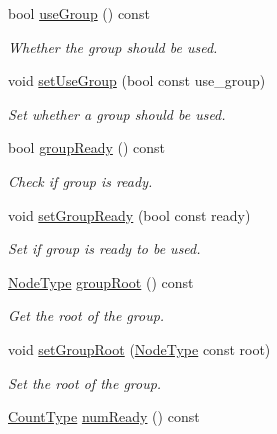 \begin{DoxyCompactItemize}
bool \hyperlink{structvt_1_1vrt_1_1collection_1_1_holder_af9a9e5dbf89d84e9fb4d267f720bfa4e}{use\+Group} () const
\begin{DoxyCompactList}\small\item\em Whether the group should be used. \end{DoxyCompactList}\item 
void \hyperlink{structvt_1_1vrt_1_1collection_1_1_holder_aa76e02e027429572c1c9b2169d013e56}{set\+Use\+Group} (bool const use\+\_\+group)
\begin{DoxyCompactList}\small\item\em Set whether a group should be used. \end{DoxyCompactList}\item 
bool \hyperlink{structvt_1_1vrt_1_1collection_1_1_holder_afeafe4c77613531a166be80bdaea4fd6}{group\+Ready} () const
\begin{DoxyCompactList}\small\item\em Check if group is ready. \end{DoxyCompactList}\item 
void \hyperlink{structvt_1_1vrt_1_1collection_1_1_holder_aa666f9e2960605203d325fd39de82dd7}{set\+Group\+Ready} (bool const ready)
\begin{DoxyCompactList}\small\item\em Set if group is ready to be used. \end{DoxyCompactList}\item 
\hyperlink{namespacevt_a866da9d0efc19c0a1ce79e9e492f47e2}{Node\+Type} \hyperlink{structvt_1_1vrt_1_1collection_1_1_holder_a4712da9a79782e5c33de2773d66cc587}{group\+Root} () const
\begin{DoxyCompactList}\small\item\em Get the root of the group. \end{DoxyCompactList}\item 
void \hyperlink{structvt_1_1vrt_1_1collection_1_1_holder_a9805b84e57120bc7088058f782eb56f4}{set\+Group\+Root} (\hyperlink{namespacevt_a866da9d0efc19c0a1ce79e9e492f47e2}{Node\+Type} const root)
\begin{DoxyCompactList}\small\item\em Set the root of the group. \end{DoxyCompactList}\item 
\hyperlink{structvt_1_1vrt_1_1collection_1_1_holder_a3251a556ac19fc7dc4d0bd388cfaedeb}{Count\+Type} \hyperlink{structvt_1_1vrt_1_1collection_1_1_holder_a9911d92bf71796a7c4b83ebe60db1f5e}{num\+Ready} () const

\end{DoxyCompactItemize}
